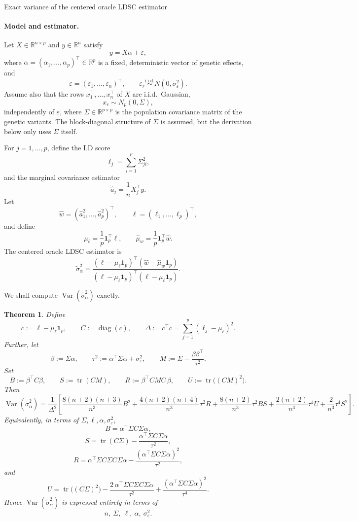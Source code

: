 \documentclass[11pt]{article}
\newtheorem{theorem}{Theorem}
\newcommand{\R}{\mathbb{R}}
\newcommand{\1}{\mathbf{1}}
\newcommand{\tr}{\operatorname{tr}}
\newcommand{\Var}{\operatorname{Var}}
\begin{document}
\begin{center}
    {\Large Exact variance of the centered oracle LDSC estimator}\\[1em]
\end{center}

\paragraph{Model and estimator.}
Let \(X\in\R^{n\times p}\) and \(y\in\R^n\) satisfy
\[
y=X\alpha+\varepsilon,
\]
where \(\alpha=(\alpha_1,\dots,\alpha_p)^\top\in\R^p\) is a fixed, deterministic vector of genetic effects, and
\[
\varepsilon=(\varepsilon_1,\dots,\varepsilon_n)^\top,\qquad
\varepsilon_r\stackrel{\mathrm{i.i.d.}}{\sim}N(0,\sigma_\varepsilon^2).
\]
Assume also that the rows \(x_1^\top,\dots,x_n^\top\) of \(X\) are i.i.d.\ Gaussian,
\[
x_r\sim N_p(0,\Sigma),
\]
independently of \(\varepsilon\), where \(\Sigma\in\R^{p\times p}\) is the population covariance matrix of the genetic variants. The block-diagonal structure of \(\Sigma\) is assumed, but the derivation below only uses \(\Sigma\) itself.

For \(j=1,\dots,p\), define the LD score
\[
\ell_j=\sum_{i=1}^p \Sigma_{ji}^2,
\]
and the marginal covariance estimator
\[
\widehat a_j=\frac{1}{n}X_j^\top y.
\]
Let
\[
\widehat w=(\widehat a_1^2,\dots,\widehat a_p^2)^\top,\qquad
\ell=(\ell_1,\dots,\ell_p)^\top,
\]
and define
\[
\mu_\ell=\frac{1}{p}\1_p^\top \ell,\qquad
\widehat\mu_w=\frac{1}{p}\1_p^\top \widehat w.
\]
The centered oracle LDSC estimator is
\[
\widetilde{\sigma}_\alpha^2
=
\frac{(\ell-\mu_\ell\1_p)^\top(\widehat w-\widehat\mu_w\1_p)}
     {(\ell-\mu_\ell\1_p)^\top(\ell-\mu_\ell\1_p)}.
\]

We shall compute \(\Var(\widetilde{\sigma}_\alpha^2)\) exactly.

\bigskip

\begin{theorem}
Define
\[
c:=\ell-\mu_\ell\1_p,\qquad
C:=\operatorname{diag}(c),\qquad
\Delta:=c^\top c=\sum_{j=1}^p(\ell_j-\mu_\ell)^2.
\]
Further, let
\[
\beta:=\Sigma\alpha,\qquad
\tau^2:=\alpha^\top\Sigma\alpha+\sigma_\varepsilon^2,
\qquad
M:=\Sigma-\frac{\beta\beta^\top}{\tau^2}.
\]
Set
\[
B:=\beta^\top C\beta,
\qquad
S:=\tr(CM),
\qquad
R:=\beta^\top CMC\,\beta,
\qquad
U:=\tr\!\bigl((CM)^2\bigr).
\]
Then
\[
\Var(\widetilde{\sigma}_\alpha^2)
=
\frac{1}{\Delta^2}
\left[
\frac{8(n+2)(n+3)}{n^3}B^2
+\frac{4(n+2)(n+4)}{n^3}\tau^2R
+\frac{8(n+2)}{n^3}\tau^2BS
+\frac{2(n+2)}{n^3}\tau^4U
+\frac{2}{n^3}\tau^4S^2
\right].
\]
Equivalently, in terms of \(\Sigma,\ell,\alpha,\sigma_\varepsilon^2\),
\[
B=\alpha^\top\Sigma C\Sigma\alpha,
\]
\[
S=\tr(C\Sigma)-\frac{\alpha^\top\Sigma C\Sigma\alpha}{\tau^2},
\]
\[
R=
\alpha^\top\Sigma C\Sigma C\Sigma\alpha
-\frac{(\alpha^\top\Sigma C\Sigma\alpha)^2}{\tau^2},
\]
and
\[
U=
\tr\!\bigl((C\Sigma)^2\bigr)
-\frac{2\,\alpha^\top\Sigma C\Sigma C\Sigma\alpha}{\tau^2}
+\frac{(\alpha^\top\Sigma C\Sigma\alpha)^2}{\tau^4}.
\]
Hence \(\Var(\widetilde{\sigma}_\alpha^2)\) is expressed entirely in terms of
\[
n,\ \Sigma,\ \ell,\ \alpha,\ \sigma_\varepsilon^2.
\]
\end{theorem}
\end{document}
